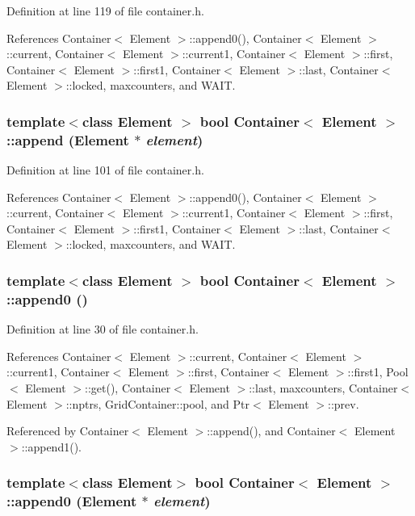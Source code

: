 Definition at line 119 of file container.h.

References Container$<$ Element $>$::append0(), Container$<$ Element $>$::current, Container$<$ Element $>$::current1, Container$<$ Element $>$::first, Container$<$ Element $>$::first1, Container$<$ Element $>$::last, Container$<$ Element $>$::locked, maxcounters, and WAIT.\hypertarget{classContainer_21a095c892fbee7317e68ed66f924c26}{
\subsubsection[{append}]{\setlength{\rightskip}{0pt plus 5cm}template$<$class Element $>$ bool {\bf Container}$<$ Element $>$::append (Element $\ast$ {\em element})}}
\label{classContainer_21a095c892fbee7317e68ed66f924c26}




Definition at line 101 of file container.h.

References Container$<$ Element $>$::append0(), Container$<$ Element $>$::current, Container$<$ Element $>$::current1, Container$<$ Element $>$::first, Container$<$ Element $>$::first1, Container$<$ Element $>$::last, Container$<$ Element $>$::locked, maxcounters, and WAIT.\hypertarget{classContainer_5787ab25b2b0bcc13156075cb7a026f2}{
\subsubsection[{append0}]{\setlength{\rightskip}{0pt plus 5cm}template$<$class Element $>$ bool {\bf Container}$<$ Element $>$::append0 ()}}
\label{classContainer_5787ab25b2b0bcc13156075cb7a026f2}




Definition at line 30 of file container.h.

References Container$<$ Element $>$::current, Container$<$ Element $>$::current1, Container$<$ Element $>$::first, Container$<$ Element $>$::first1, Pool$<$ Element $>$::get(), Container$<$ Element $>$::last, maxcounters, Container$<$ Element $>$::nptrs, GridContainer::pool, and Ptr$<$ Element $>$::prev.

Referenced by Container$<$ Element $>$::append(), and Container$<$ Element $>$::append1().\hypertarget{classContainer_09b797857d3c1f37ca6f56641589bee7}{
\subsubsection[{append0}]{\setlength{\rightskip}{0pt plus 5cm}template$<$class Element$>$ bool {\bf Container}$<$ Element $>$::append0 (Element $\ast$ {\em element})}}
\label{classContainer_09b797857d3c1f37ca6f56641589bee7}


